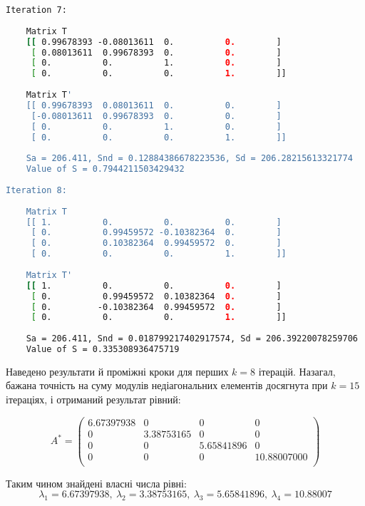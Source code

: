 \documentclass[a4paper,14pt]{extarticle} %
\begin{document}
\newpage
\begin{lstlisting}[language=bash, stringstyle=\small\ttfamily, emphstyle={[1]\small\ttfamily}, frame=none, numbers=none]
Iteration 7:
    
    Matrix T
    [[ 0.99678393 -0.08013611  0.          0.        ]
     [ 0.08013611  0.99678393  0.          0.        ]
     [ 0.          0.          1.          0.        ]
     [ 0.          0.          0.          1.        ]]
    
    Matrix T'
    [[ 0.99678393  0.08013611  0.          0.        ]
     [-0.08013611  0.99678393  0.          0.        ]
     [ 0.          0.          1.          0.        ]
     [ 0.          0.          0.          1.        ]]
    
    Sa = 206.411, Snd = 0.12884386678223536, Sd = 206.28215613321774
    Value of S = 0.7944211503429432
    
Iteration 8:
    
    Matrix T
    [[ 1.          0.          0.          0.        ]
     [ 0.          0.99459572 -0.10382364  0.        ]
     [ 0.          0.10382364  0.99459572  0.        ]
     [ 0.          0.          0.          1.        ]]
    
    Matrix T'
    [[ 1.          0.          0.          0.        ]
     [ 0.          0.99459572  0.10382364  0.        ]
     [ 0.         -0.10382364  0.99459572  0.        ]
     [ 0.          0.          0.          1.        ]]
    
    Sa = 206.411, Snd = 0.018799217402917574, Sd = 206.39220078259706
    Value of S = 0.335308936475719
\end{lstlisting}

Наведено результати й проміжні кроки для перших $k=8$ ітерацій. Назагал, бажана точність на суму модулів недіагональних елементів 
досягнута при $k=15$ ітераціях, і отриманий результат рівний:

\[
A^*=
    \begin{pmatrix}
        6.67397938 & 0 & 0 & 0 \\
        0 & 3.38753165 & 0 & 0 \\
        0 & 0 & 5.65841896 & 0 \\
        0 & 0 & 0 & 10.88007000 \\
    \end{pmatrix}
\]

Таким чином знайдені власні числа рівні: 
\[ \lambda_1=6.67397938,\  \lambda_2=3.38753165,\ \lambda_3=5.65841896,\ \lambda_4=10.88007 \]
\end{document}

